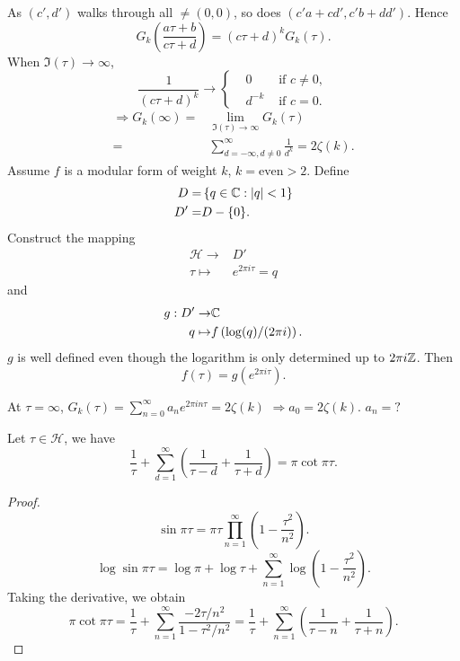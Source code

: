     As $(c',d')$ walks through all $\neq (0,0)$, so does $(c'a+cd',c'b+d d')$. Hence
    \[
      G_k\left( \frac{a\tau+b}{c\tau+d} \right) =\left( c\tau+d \right) ^{k}G_k(\tau).
    \]
    When $\Im(\tau)\to \infty$,
  \begin{equation*}
    \frac{1}{(c\tau+d)^{k}}\to\left\{\begin{aligned}
	&0 & \text{ if }c\neq 0,\\
	&d^{-k}& \text{ if }c=0.
    \end{aligned}\right.
  \end{equation*}
  \begin{align*}
    \Rightarrow G_k(\infty)=& \lim_{\Im(\tau) \to \infty} G_k(\tau)\\
    =& \sum_{d=-\infty,d\neq 0}^{\infty} \frac{1}{d^{k}}=2\zeta(k)
  .\end{align*}
  Assume $f$ is a modular form of weight  $k$, $k=\text{even}>2$. Define
  \begin{align*}
    D=&\left\{ q\in \mathbb{C}:|q|<1 \right\}\\
    D'=&D-\{0\} 
  .\end{align*}
 Construct the mapping
 \begin{align*}
   \mathcal{H}\to&D'\\
   \tau\mapsto&e^{2\pi i\tau}=q
 \end{align*}
 and
 \begin{align*}
   g:D'\to&\mathbb{C}\\
   q\mapsto & f\left( \log(q)/(2\pi i) \right). 
 \end{align*}
$g$ is well defined even though the logarithm is only determined up to $2\pi i\mathbb{Z}$. Then 
\[
  f(\tau)=g(e^{2\pi i\tau}).
\]

At $\tau=\infty$, $G_k(\tau)=\sum_{n=0}^{\infty} a_ne^{2\pi in\tau}=2\zeta(k)$  $\Rightarrow a_0=2\zeta(k)$. $a_n=?$ 
\begin{proposition}
  Let $\tau \in \mathcal{H}$, we have
  \[
    \frac{1}{\tau}+\sum_{d=1}^{\infty} \left(\frac{1}{\tau-d}+\frac{1}{\tau+d}\right)=\pi\cot \pi\tau.
  \] 
\end{proposition}
\begin{proof}
  \[
    \sin \pi\tau=\pi\tau \prod_{n=1}^{\infty}\left( 1- \frac{\tau^2}{n^2} \right). 
  \] 
  \[
    \log \sin \pi\tau =\log \pi+\log\tau+\sum_{n=1}^{\infty} \log\left( 1- \frac{\tau^2}{n^2} \right) .
  \] 
  Taking the derivative, we obtain
  \[
    \pi\cot\pi\tau=\frac{1}{\tau}+\sum_{n=1}^{\infty} \frac{-2\tau /n^2}{1-\tau^2 /n^2}=\frac{1}{\tau}+\sum_{n=1}^{\infty} \left( \frac{1}{\tau-n}+\frac{1}{\tau+n} \right). 
  \] 
\end{proof}

